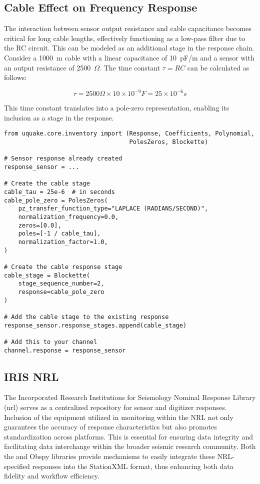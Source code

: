 \subsection{Cable Effect on Frequency Response}

The interaction between sensor output resistance and cable capacitance becomes critical for long cable lengths, effectively functioning as a low-pass filter due to the RC circuit. This can be modeled as an additional stage in the response chain. Consider a 1000~m cable with a linear capacitance of 10~pF/m and a sensor with an output resistance of 2500~$\Omega$. The time constant \(\tau = RC\) can be calculated as follows:

\[
\tau = 2500 \Omega \times 10 \times 10^{-9} F = 25 \times 10^{-6} s
\]

This time constant translates into a pole-zero representation, enabling its inclusion as a stage in the response.

\begin{verbatim}
from uquake.core.inventory import (Response, Coefficients, Polynomial,
                                   PolesZeros, Blockette)

# Sensor response already created
response_sensor = ...

# Create the cable stage
cable_tau = 25e-6  # in seconds
cable_pole_zero = PolesZeros(
    pz_transfer_function_type="LAPLACE (RADIANS/SECOND)",
    normalization_frequency=0.0,
    zeros=[0.0],
    poles=[-1 / cable_tau],
    normalization_factor=1.0,
)

# Create the cable response stage
cable_stage = Blockette(
    stage_sequence_number=2,
    response=cable_pole_zero
)

# Add the cable stage to the existing response
response_sensor.response_stages.append(cable_stage)

# Add this to your channel
channel.response = response_sensor
\end{verbatim}



\subsection{IRIS NRL}
The Incorporated Research Institutions for Seismology Nominal Response Library (\gls{nrl}) serves as a centralized repository for sensor and digitizer responses. Inclusion of the equipment utilized in \museismic monitoring within the NRL not only guarantees the accuracy of response characteristics but also promotes standardization across platforms. This is essential for ensuring data integrity and facilitating data interchange within the broader seismic research community. Both the \muquake and Obspy libraries provide mechanisms to easily integrate these NRL-specified responses into the StationXML format, thus enhancing both data fidelity and workflow efficiency.



